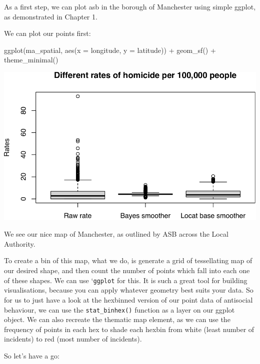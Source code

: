 \documentclass[
]{book}
\newenvironment{Shaded}{\begin{snugshade}}{\end{snugshade}}
\newcommand{\AttributeTok}[1]{\textcolor[rgb]{0.77,0.63,0.00}{#1}}
\newcommand{\FunctionTok}[1]{\textcolor[rgb]{0.00,0.00,0.00}{#1}}
\newcommand{\NormalTok}[1]{#1}
\newcommand{\SpecialCharTok}[1]{\textcolor[rgb]{0.00,0.00,0.00}{#1}}
\begin{document}
As a first step, we can plot asb in the borough of Manchester using simple ggplot, as demonstrated in Chapter 1.

We can plot our points first:

\begin{Shaded}
\begin{Highlighting}[]
\FunctionTok{ggplot}\NormalTok{(ma\_spatial, }\FunctionTok{aes}\NormalTok{(}\AttributeTok{x =}\NormalTok{ longitude, }\AttributeTok{y =}\NormalTok{ latitude)) }\SpecialCharTok{+}
  \FunctionTok{geom\_sf}\NormalTok{() }\SpecialCharTok{+} 
  \FunctionTok{theme\_minimal}\NormalTok{()}
\end{Highlighting}
\end{Shaded}

\includegraphics{crime_mapping_files/figure-latex/unnamed-chunk-117-1.pdf}

We see our nice map of Manchester, as outlined by ASB across the Local Authority.

To create a bin of this map, what we do, is generate a grid of tessellating map of our desired shape, and then count the number of points which fall into each one of these shapes. We can use `\texttt{ggplot} for this. It is such a great tool for building visualisations, because you can apply whatever geometry best suits your data. So for us to just have a look at the hexbinned version of our point data of antisocial behaviour, we can use the \texttt{stat\_binhex()} function as a layer on our ggplot object. We can also recreate the thematic map element, as we can use the frequency of points in each hex to shade each hexbin from white (least number of incidents) to red (most number of incidents).

So let's have a go:
\end{document}
